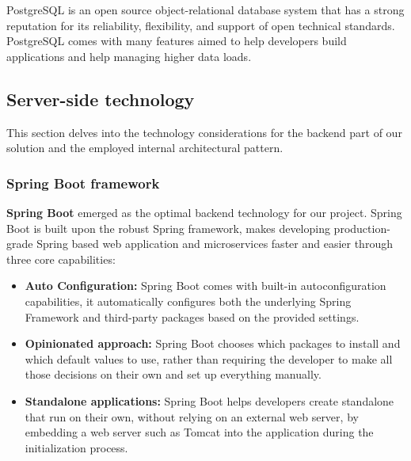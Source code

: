 \noindent PostgreSQL is an open source object-relational database system that has a strong reputation for its
reliability, flexibility, and support of open technical standards. PostgreSQL comes with many features
aimed to help developers build applications and help managing higher data loads.


\subsection{Server-side technology}
This section delves into the technology considerations for the backend part of our solution and the
employed internal architectural pattern.

\subsubsection{Spring Boot framework}
\textbf{Spring Boot} emerged as the optimal backend technology for our project.
Spring Boot is built upon the robust Spring framework, makes developing production-grade Spring based
web application and microservices faster and easier through three core capabilities:

\begin{itemize}
      \item \textbf{Auto Configuration:} Spring Boot comes with built-in autoconfiguration capabilities,
            it automatically configures both the underlying Spring Framework and third-party packages based
            on the provided settings.
      \item \textbf{Opinionated approach:}  Spring Boot chooses which packages to install and which default
            values to use, rather than requiring the developer to make all those decisions on their own and set
            up everything manually.
      \item \textbf{Standalone applications:} Spring Boot helps developers create standalone
            that run on their own, without relying on an external web server, by embedding a web server such as
            Tomcat into the application during the initialization process.
\end{itemize}

